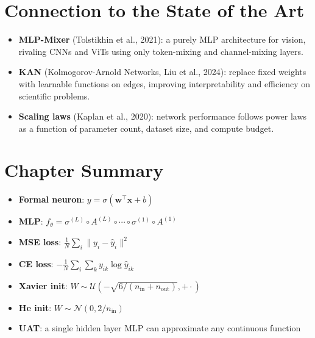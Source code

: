 \section{Connection to the State of the Art}
\label{sec:sota_mlp}

\begin{sota}
\begin{itemize}
\item \textbf{MLP-Mixer} (Tolstikhin et al., 2021): a purely MLP architecture for vision, rivaling CNNs and ViTs using only token-mixing and channel-mixing layers.
\item \textbf{KAN} (Kolmogorov-Arnold Networks, Liu et al., 2024): replace fixed weights with learnable functions on edges, improving interpretability and efficiency on scientific problems.
\item \textbf{Scaling laws} (Kaplan et al., 2020): network performance follows power laws as a function of parameter count, dataset size, and compute budget.
\end{itemize}
\end{sota}

\section{Chapter Summary}

\begin{keyformulas}
\begin{itemize}
\item \textbf{Formal neuron}: $y = \sigma(\bm{w}^\top \bm{x} + b)$
\item \textbf{MLP}: $f_\theta = \sigma^{(L)} \circ A^{(L)} \circ \cdots \circ \sigma^{(1)} \circ A^{(1)}$
\item \textbf{MSE loss}: $\frac{1}{N}\sum_i \|y_i - \hat{y}_i\|^2$
\item \textbf{CE loss}: $-\frac{1}{N}\sum_i \sum_k y_{ik}\log\hat{y}_{ik}$
\item \textbf{Xavier init}: $W \sim \mathcal{U}(-\sqrt{6/(n_{\mathrm{in}}+n_{\mathrm{out}})}, +\cdot)$
\item \textbf{He init}: $W \sim \mathcal{N}(0, 2/n_{\mathrm{in}})$
\item \textbf{UAT}: a single hidden layer MLP can approximate any continuous function
\end{itemize}
\end{keyformulas}

